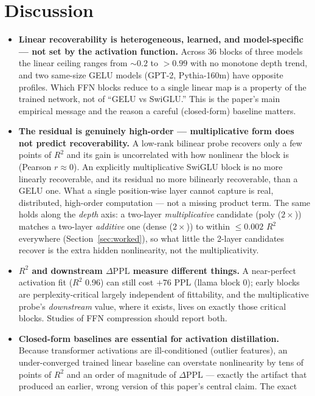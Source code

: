 \documentclass{article}
\newcommand{\dppl}{\Delta\mathrm{PPL}}
\begin{document}
\section{Discussion}
\label{sec:discussion}

\begin{itemize}
\item \textbf{Linear recoverability is heterogeneous, learned, and model-specific --- not set by
  the activation function.} Across 36 blocks of three models the linear ceiling ranges from
  ${\sim}0.2$ to $>0.99$ with no monotone depth trend, and two same-size GELU models (GPT-2,
  Pythia-160m) have opposite profiles. Which FFN blocks reduce to a single linear map is a property
  of the trained network, not of ``GELU vs SwiGLU.'' This is the paper's main empirical message and
  the reason a careful (closed-form) baseline matters.
\item \textbf{The residual is genuinely high-order --- multiplicative form does not predict
  recoverability.} A low-rank bilinear probe recovers only a few points of $R^2$ and its gain is
  uncorrelated with how nonlinear the block is (Pearson $r\approx 0$). An explicitly multiplicative
  SwiGLU block is no more linearly recoverable, and its residual no more bilinearly recoverable,
  than a GELU one. What a single position-wise layer cannot capture is real, distributed,
  high-order computation --- not a missing product term. The same holds along the \emph{depth} axis:
  a two-layer \emph{multiplicative} candidate (poly ($2\times$)) matches a two-layer \emph{additive}
  one (dense ($2\times$)) to within $\le 0.002$ $R^2$ everywhere (Section~\ref{sec:worked}), so what
  little the 2-layer candidates recover is the extra hidden nonlinearity, not the multiplicativity.
\item \textbf{$R^2$ and downstream $\dppl$ measure different things.} A near-perfect activation fit
  ($R^2$ 0.96) can still cost $+76$ PPL (llama block 0); early blocks are perplexity-critical largely
  independent of fittability, and the multiplicative probe's \emph{downstream} value, where it
  exists, lives on exactly those critical blocks. Studies of FFN compression should report both.
\item \textbf{Closed-form baselines are essential for activation distillation.} Because transformer
  activations are ill-conditioned (outlier features), an under-converged trained linear baseline can
  overstate nonlinearity by tens of points of $R^2$ and an order of magnitude of $\dppl$ --- exactly
  the artifact that produced an earlier, wrong version of this paper's central claim. The exact

\end{itemize}
\end{document}

